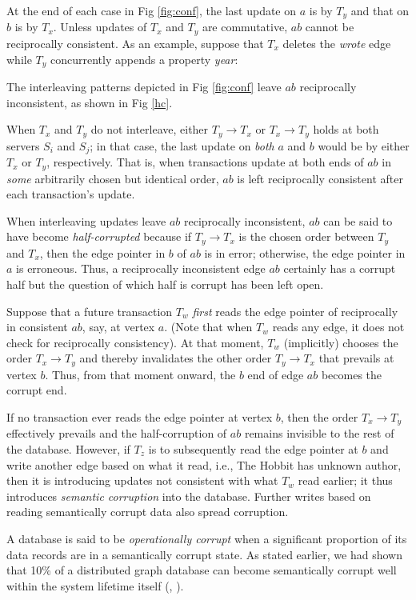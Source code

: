 At the end of each case in Fig \ref{fig:conf}, the last update on $a$ is by $T_y$ and that on $b$ is by $T_x$. Unless updates of $T_x$ and $T_y$ are commutative, $ab$ cannot be reciprocally consistent. As an example, suppose that $T_x$ deletes the \emph{wrote} edge while $T_y$ concurrently appends a property \emph{year}:


The interleaving patterns depicted in Fig \ref{fig:conf} leave $ab$ reciprocally inconsistent, as shown in Fig \ref{hc}.

When $T_x$ and $T_y$ do not interleave,  either $T_y \rightarrow T_x$ or $T_x \rightarrow T_y$ holds at both servers $S_i$ and $S_j$; in that case, the last update on \emph{both} $a$ and $b$ would be by either $T_x$ or $T_y$, respectively. That is, when transactions update at both ends of $ab$  in \emph{some} arbitrarily chosen but identical order, $ab$ is left  reciprocally consistent after each transaction's update.

When interleaving updates leave $ab$ reciprocally inconsistent, $ab$ can be said to have become \emph{half-corrupted} because if $T_y \rightarrow T_x$ is the chosen order between $T_y$ and $T_x$, then the edge pointer in $b$ of $ab$ is in error; otherwise, the edge pointer in $a$ is erroneous. Thus, a reciprocally inconsistent edge $ab$ certainly has a corrupt half but the question of which half is corrupt has been left open.

Suppose that a future transaction $T_w$ \emph{first} reads the edge pointer of reciprocally in consistent $ab$, say, at vertex $a$. (Note that when $T_w$ reads any edge, it does not check for reciprocally consistency). At that moment, $T_w$ (implicitly) chooses the order $T_x \rightarrow T_y$ and thereby invalidates the other order $T_y \rightarrow T_x$ that prevails at vertex $b$. Thus, from that moment onward, the $b$ end of edge $ab$ becomes the corrupt end.

If no transaction ever reads the edge pointer at vertex $b$, then the order $T_x \rightarrow T_y$ effectively prevails and the half-corruption of $ab$ remains invisible to the rest of the database. However, if $T_z$ is to subsequently read the edge pointer at $b$ and write another edge based on what it read, i.e., The Hobbit has unknown author, then it is introducing updates not consistent with what $T_w$ read earlier; it thus introduces \emph{semantic corruption} into the database. Further writes based on reading semantically corrupt data also spread corruption.

A database is said to be \emph{operationally corrupt} when a significant proportion of its data records are in a semantically corrupt state. As stated earlier, we had shown that 10\%  of a distributed graph database can become semantically corrupt well within the system lifetime itself (\cite{Ezhilchelvan2018}, \cite{Webber2019}).

